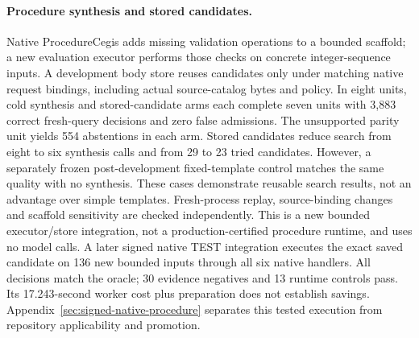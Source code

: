 \paragraph{Procedure synthesis and stored candidates.}
Native ProcedureCegis adds missing validation operations to a bounded scaffold;
a new evaluation executor performs those checks on concrete integer-sequence
inputs. A development body store reuses candidates only under matching native
request bindings, including actual source-catalog bytes and policy. In eight
units, cold synthesis and stored-candidate arms each complete seven units with
3,883 correct fresh-query decisions and zero false admissions. The unsupported
parity unit yields 554 abstentions in each arm. Stored candidates reduce search
from eight to six synthesis calls and from 29 to 23 tried candidates. However,
a separately frozen post-development fixed-template control matches the same
quality with no synthesis. These cases demonstrate reusable search results,
not an advantage over simple templates. Fresh-process replay, source-binding
changes and scaffold sensitivity are checked independently. This is a new
bounded executor/store integration, not a production-certified procedure
runtime, and uses no model calls.
A later signed native TEST integration executes the exact saved candidate on
136 new bounded inputs through all six native handlers. All decisions match
the oracle; 30 evidence negatives and 13 runtime controls pass. Its 17.243-second
worker cost plus preparation does not establish savings. Appendix~\ref{sec:signed-native-procedure}
separates this tested execution from repository applicability and promotion.


